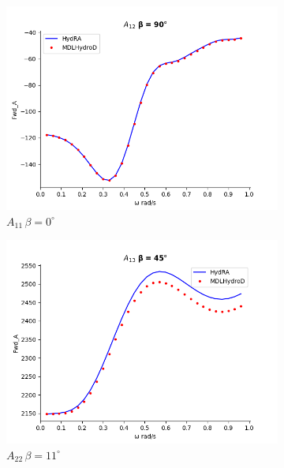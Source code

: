\begin{figure}[H]
\begin{subfigure}[b]{0.45\textwidth}
    \end{subfigure}
    \vspace{5pt}%
    \begin{subfigure}[b]{0.45\textwidth}
        \includegraphics[width=\textwidth]{plots/kcs/added_mass/A12_BETA_90.png}
        \caption{$A_{11}\, \beta=0^{\circ}$}
    \end{subfigure}
    \begin{subfigure}[b]{0.45\textwidth}
        \includegraphics[width=\textwidth]{plots/kcs/added_mass/A13_ BETA_45.png}
        \caption{$A_{22} \, \beta = 11^{\circ}$}
    \end{subfigure}
    \vspace{5pt}%
    \begin{subfigure}[b]{0.45\textwidth}

\end{subfigure}
\end{figure}
